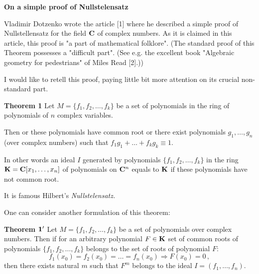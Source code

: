 \def\vare {\varepsilon}
\def\A {{\bf A}}
\def\t {\tilde}
\def\a {\alpha}
\def\K {{\bf K}}
\def\N {{\bf N}}
\def\V {{\cal V}}
\def\s {{\sigma}}
\def\S {{\Sigma}}
\def\s {{\sigma}}
\def\p{\partial}
\def\vare{{\varepsilon}}
\def\Q {{\bf Q}}
\def\D {{\cal D}}
\def\G {{\Gamma}}
\def\C {{\bf C}}
\def\M {{\cal M}}
\def\Z {{\bf Z}}
\def\U  {{\cal U}}
\def\H {{\cal H}}
\def\R  {{\bf K}}
\def\E  {{\bf E}}
\def\l {\lambda}
\def\degree {{\bf {\rm degree}\,\,}}
\def \finish {${\,\,\vrule height1mm depth2mm width 8pt}$}
\def \m {\medskip}
\def\p {\partial}
\def\r {{\bf r}}
\def\v {{\bf v}}
\def\n {{\bf n}}
\def\t {{\bf t}}
\def\b {{\bf b}}
\def\c {{\bf c }}
\def\e{{\bf e}}
\def\ac {{\bf a}}
\def \X   {{\bf X}}
\def \Y   {{\bf Y}}
\def \x   {{\bf x}}
\def \y   {{\bf y}}
\def \G{{\cal G}}

\centerline {\bf On a simple proof of Nullstelensatz}

\bigskip


  Vladimir Dotzenko wrote the article [1] where he described a simple proof of
  Nullstellensatz for the field $\C$ of complex numbers.  As it is claimed in this article,
  this proof is "a part of mathematical folklore".
  (The standard proof of this Theorem possesses a "difficult part". (See e.g.
  the excellent book "Algebraic geometry for pedestrians" of Miles Read [2].))



  I would like to retell this proof, paying little bit more attention on
  its crucial non-standard part.


  \m

   {\bf Theorem 1} Let $M=\{f_1,f_2,\dots,f_k\}$ be a set of polynomials in the ring
   of polynomials of $n$ complex variables. 
   


 Then   or these polynomials have common root or there exist polynomials
    $g_1,\dots,g_n$ (over complex numbers) such that
    $f_1g_1+\dots+f_kg_k\equiv 1$.

In other words an ideal $I$ generated by polynomials $\{f_1,f_2,\dots,f_k\}$
in the ring $\R=\C[x_1,\dots,x_n]$ of polynomials on $\C^n$
equals to $\R$ if  these polynomials have not common root.

\m

It is famous Hilbert's {\it  Nullstelensatz.}


One can consider another formulation of this theorem:

\m

{\bf Theorem $\bf 1'$}  Let $M=\{f_1,f_2,\dots,f_k\}$ be a set of polynomials over complex numbers.
  Then if for an arbitrary polynomial $F\in \R$ set of common  roots of polynomials
   $\{f_1,f_2,\dots,f_k\}$ belongs to the set of roots of polynomial $F$:
                    $$
         f_1(x_0)=f_2(x_0)=\dots=f_n(x_0)\Rightarrow  F(x_0)=0\,,
                    $$
   then there exists natural $m$ such that $F^m$ belongs to the ideal $I=(f_1,\dots,f_n)$.

